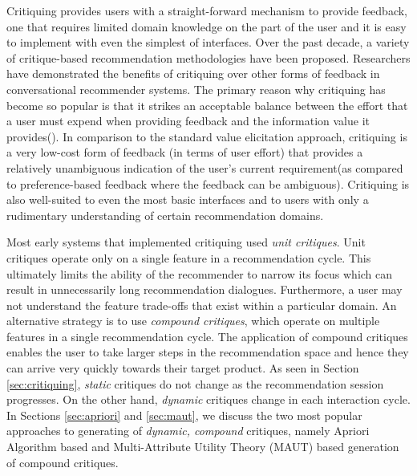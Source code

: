 Critiquing  provides users with a straight-forward mechanism to provide feedback, one that requires limited domain knowledge on the part of the user and it is easy to implement with even the simplest of interfaces.
Over the past decade, a variety of critique-based recommendation methodologies have been proposed.
Researchers have demonstrated the benefits of critiquing over other forms of feedback in conversational recommender systems.
The primary reason why critiquing has become so popular is that it strikes an acceptable balance between the effort that a user must expend when providing feedback and the information value it provides(\cite{mcginty11}).
In comparison to the standard value elicitation approach, critiquing is a very low-cost form of feedback (in terms of user effort) that provides a relatively unambiguous indication of the user's current requirement(as compared to preference-based feedback where the feedback can be ambiguous).
 Critiquing is also well-suited to even the most basic interfaces and to users with only a rudimentary understanding of certain recommendation domains.



Most early systems that implemented critiquing used \textit{unit critiques}.
Unit critiques operate only on a single feature in a recommendation cycle. 
This ultimately limits the ability of the recommender to narrow its focus which can result in unnecessarily long recommendation dialogues.
Furthermore, a user may not understand the feature trade-offs that exist within a particular domain.
An alternative strategy is to use \textit{compound critiques}, which operate on multiple features in a single recommendation cycle.
The application of compound critiques enables the user to take larger steps in the recommendation space and hence they can arrive very quickly towards their target product.
As seen in Section \ref{sec:critiquing}, \textit{static} critiques do not change as the recommendation session progresses. 
On the other hand, \textit{dynamic} critiques change in each interaction cycle.
In Sections \ref{sec:apriori} and \ref{sec:maut}, we discuss the two most popular approaches to generating of \textit{dynamic, compound} critiques, namely Apriori Algorithm based  and Multi-Attribute Utility Theory (MAUT) based generation of compound critiques.




